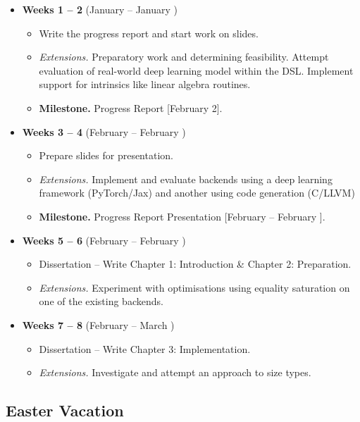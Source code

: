 \begin{itemize}
    \item \textbf{Weeks 1 -- 2} (January  -- January )  \begin{itemize}
        \item Write the progress report and start work on slides.
        \item \textit{Extensions.} Preparatory work and determining feasibility. Attempt evaluation of real-world deep learning model within the DSL. Implement support for intrinsics like linear algebra routines.
        \item \textbf{Milestone.} Progress Report [February 2].
    \end{itemize}
    \item \textbf{Weeks 3 -- 4} (February  -- February )  \begin{itemize}
        \item Prepare slides for presentation.
        \item \textit{Extensions.} Implement and evaluate backends using a deep learning framework (PyTorch/Jax) and another using code generation (C/LLVM)
        \item \textbf{Milestone.} Progress Report Presentation [February  -- February ].
    \end{itemize}
    \item \textbf{Weeks 5 -- 6} (February  -- February ) \begin{itemize}
        \item Dissertation -- Write Chapter 1: Introduction \& Chapter 2: Preparation.
        \item \textit{Extensions.} Experiment with optimisations using equality saturation on one of the existing backends.
    \end{itemize}
    \item \textbf{Weeks 7 -- 8} (February  -- March ) \begin{itemize}
        \item Dissertation -- Write Chapter 3: Implementation.
        \item \textit{Extensions.} Investigate and attempt an approach to size types.
    \end{itemize}
\end{itemize}

\subsection{Easter Vacation}


